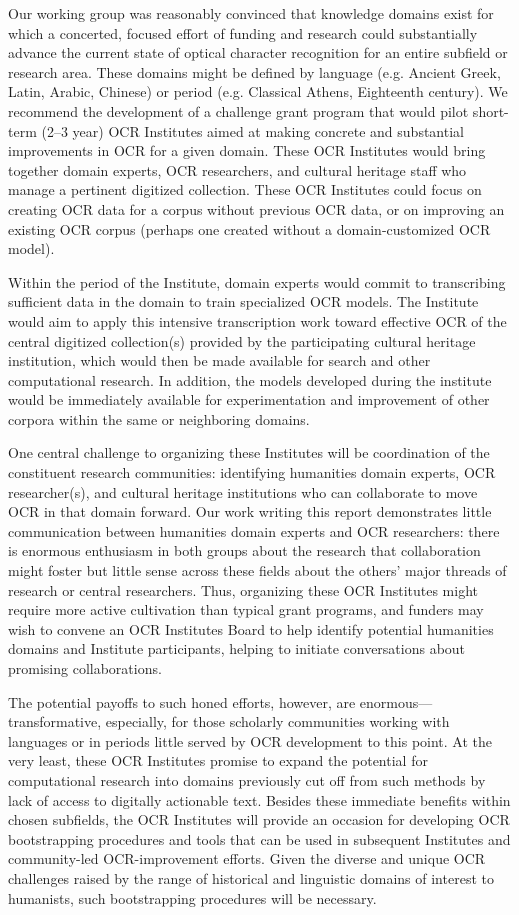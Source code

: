 \documentclass[twoside,11pt]{report}
\begin{document}
Our working group was reasonably convinced that knowledge domains exist for which a concerted, focused effort of funding and research could substantially advance the current state of optical character recognition for an entire subfield or research area. These domains might be defined by language (e.g. Ancient Greek, Latin, Arabic, Chinese) or period (e.g. Classical Athens, Eighteenth century). We recommend the development of a challenge grant program that would pilot short-term (2--3 year) OCR Institutes aimed at making concrete and substantial improvements in OCR for a given domain. These OCR Institutes would bring together domain experts, OCR researchers, and cultural heritage staff who manage a pertinent digitized collection. These OCR Institutes could focus on creating OCR data for a corpus without previous OCR data, or on improving an existing OCR corpus (perhaps one created without a domain-customized OCR model).

Within the period of the Institute, domain experts would commit to transcribing sufficient data in the domain to train specialized OCR models. The Institute would aim to apply this intensive transcription work toward effective OCR of the central digitized collection(s) provided by the participating cultural heritage institution, which would then be made available for search and other computational research. In addition, the models developed during the institute would be immediately available for experimentation and improvement of other corpora within the same or neighboring domains.

One central challenge to organizing these Institutes will be coordination of the constituent research communities: identifying humanities domain experts, OCR researcher(s), and cultural heritage institutions who can collaborate to move OCR in that domain forward. Our work writing this report demonstrates little communication between humanities domain experts and OCR researchers: there is enormous enthusiasm in both groups about the research that collaboration might foster but little sense across these fields about the others' major threads of research or central researchers. Thus, organizing these OCR Institutes might require more active cultivation than typical grant programs, and funders may wish to convene an OCR Institutes Board to help identify potential humanities domains and Institute participants, helping to initiate conversations about promising collaborations.

The potential payoffs to such honed efforts, however, are enormous---transformative, especially, for those scholarly communities working with languages or in periods little served by OCR development to this point. At the very least, these OCR Institutes promise to expand the potential for computational research into domains previously cut off from such methods by lack of access to digitally actionable text. Besides these immediate benefits within chosen subfields, the OCR Institutes will provide an occasion for developing OCR bootstrapping procedures and tools that can be used in subsequent Institutes and community-led OCR-improvement efforts. Given the diverse and unique OCR challenges raised by the range of historical and linguistic domains of interest to humanists, such bootstrapping procedures will be necessary.
\end{document}
